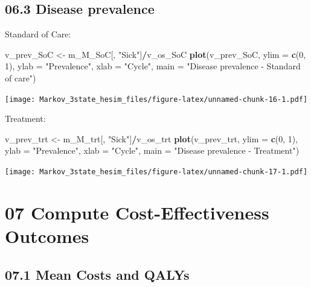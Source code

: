 \documentclass[
]{article}
\newenvironment{Shaded}{\begin{snugshade}}{\end{snugshade}}
\newcommand{\DataTypeTok}[1]{\textcolor[rgb]{0.13,0.29,0.53}{#1}}
\newcommand{\DecValTok}[1]{\textcolor[rgb]{0.00,0.00,0.81}{#1}}
\newcommand{\KeywordTok}[1]{\textcolor[rgb]{0.13,0.29,0.53}{\textbf{#1}}}
\newcommand{\NormalTok}[1]{#1}
\newcommand{\OperatorTok}[1]{\textcolor[rgb]{0.81,0.36,0.00}{\textbf{#1}}}
\newcommand{\StringTok}[1]{\textcolor[rgb]{0.31,0.60,0.02}{#1}}
\begin{document}
\hypertarget{disease-prevalence}{%
\subsection{06.3 Disease prevalence}\label{disease-prevalence}}

Standard of Care:

\begin{Shaded}
\begin{Highlighting}[]
\NormalTok{v_prev_SoC <-}\StringTok{ }\NormalTok{m_M_SoC[, }\StringTok{"Sick"}\NormalTok{]}\OperatorTok{/}\NormalTok{v_os_SoC}
\KeywordTok{plot}\NormalTok{(v_prev_SoC,}
     \DataTypeTok{ylim =} \KeywordTok{c}\NormalTok{(}\DecValTok{0}\NormalTok{, }\DecValTok{1}\NormalTok{),}
     \DataTypeTok{ylab =} \StringTok{"Prevalence"}\NormalTok{,}
     \DataTypeTok{xlab =} \StringTok{"Cycle"}\NormalTok{,}
     \DataTypeTok{main =} \StringTok{"Disease prevalence - Standard of care"}\NormalTok{)}
\end{Highlighting}
\end{Shaded}

\texttt{[image: Markov\_3state\_hesim\_files/figure-latex/unnamed-chunk-16-1.pdf]}

Treatment:

\begin{Shaded}
\begin{Highlighting}[]
\NormalTok{v_prev_trt <-}\StringTok{ }\NormalTok{m_M_trt[, }\StringTok{"Sick"}\NormalTok{]}\OperatorTok{/}\NormalTok{v_os_trt}
\KeywordTok{plot}\NormalTok{(v_prev_trt,}
     \DataTypeTok{ylim =} \KeywordTok{c}\NormalTok{(}\DecValTok{0}\NormalTok{, }\DecValTok{1}\NormalTok{),}
     \DataTypeTok{ylab =} \StringTok{"Prevalence"}\NormalTok{,}
     \DataTypeTok{xlab =} \StringTok{"Cycle"}\NormalTok{,}
     \DataTypeTok{main =} \StringTok{"Disease prevalence - Treatment"}\NormalTok{)}
\end{Highlighting}
\end{Shaded}

\texttt{[image: Markov\_3state\_hesim\_files/figure-latex/unnamed-chunk-17-1.pdf]}

\hypertarget{compute-cost-effectiveness-outcomes}{%
\section{07 Compute Cost-Effectiveness
Outcomes}\label{compute-cost-effectiveness-outcomes}}

\hypertarget{mean-costs-and-qalys}{%
\subsection{07.1 Mean Costs and QALYs}\label{mean-costs-and-qalys}}
\end{document}
